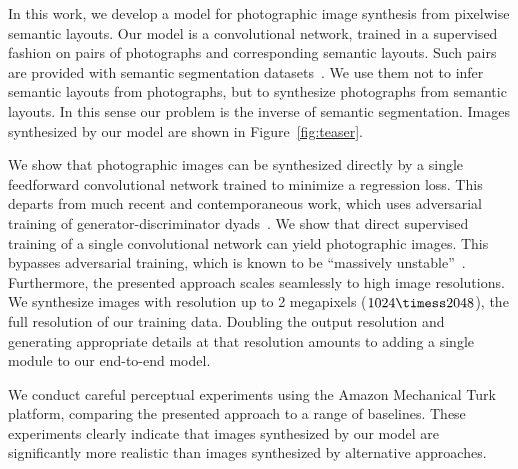 
In this work, we develop a model for photographic image synthesis from pixelwise semantic layouts. Our model is a convolutional network, trained in a supervised fashion on pairs of photographs and corresponding semantic layouts. Such pairs are provided with semantic segmentation datasets~\cite{Cordts2016}. We use them not to infer semantic layouts from photographs, but to synthesize photographs from semantic layouts. In this sense our problem is the inverse of semantic segmentation. Images synthesized by our model are shown in Figure~\ref{fig:teaser}.

We show that photographic images can be synthesized directly by a single feedforward convolutional network trained to minimize a regression loss. This departs from much recent and contemporaneous work, which uses adversarial training of generator-discriminator dyads~\cite{DosovitskiyBrox2016,Isola2017,Nguyen2016,Salimans2016}. We show that direct supervised training of a single convolutional network can yield photographic images. This bypasses adversarial training, which is known to be ``massively unstable''~\cite{ArjovskyBottou2017}.
Furthermore, the presented approach scales seamlessly to high image resolutions. We synthesize images with resolution up to 2 megapixels \mbox{($1024 \timess 2048$)}, the full resolution of our training data.
Doubling the output resolution and generating appropriate details at that resolution amounts to adding a single module to our end-to-end model.

We conduct careful perceptual experiments using the Amazon Mechanical Turk platform, comparing the presented approach to a range of baselines. These experiments clearly indicate that images synthesized by our model are significantly more realistic than images synthesized by alternative approaches.
